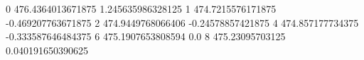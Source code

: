 0 476.4364013671875 1.245635986328125
1 474.7215576171875 -0.469207763671875
2 474.9449768066406 -0.24578857421875
4 474.857177734375 -0.333587646484375
6 475.1907653808594 0.0
8 475.23095703125 0.040191650390625
